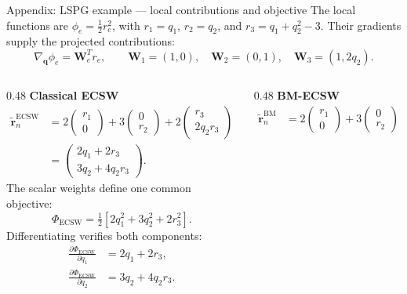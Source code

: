 \documentclass[aspectratio=169]{beamer}
\newcommand{\vect}[1]{\boldsymbol{#1}}
\newcommand{\matr}[1]{\boldsymbol{#1}}
\begin{document}
\begin{frame}{Appendix: LSPG example --- local contributions and objective}
\hypertarget{bmecsw-lspg-example-details}{}
\fontsize{9}{10.5}\selectfont
\setlength{\parskip}{0pt}
\setlength{\abovedisplayskip}{1pt}
\setlength{\belowdisplayskip}{1pt}
\setlength{\abovedisplayshortskip}{1pt}
\setlength{\belowdisplayshortskip}{1pt}
The local functions are $\phi_e=\tfrac12 r_e^2$, with
$r_1=q_1$, $r_2=q_2$, and $r_3=q_1+q_2^2-3$.
Their gradients supply the projected contributions:
\[
  \nabla_{\vect{q}}\phi_e=\matr{W}_e^T r_e,
  \qquad
  \matr{W}_1=(1,0),\quad \matr{W}_2=(0,1),\quad \matr{W}_3=(1,2q_2).
\]
\begin{columns}[T,onlytextwidth]
\begin{column}{0.48\textwidth}
\textbf{Classical ECSW}
\[
\begin{aligned}
 \widetilde{\vect{r}}_n^{\mathrm{ECSW}}
 &=2\begin{pmatrix}r_1\\0\end{pmatrix}
  +3\begin{pmatrix}0\\r_2\end{pmatrix}
  +2\begin{pmatrix}r_3\\2q_2r_3\end{pmatrix}\\[3pt]
 &=\begin{pmatrix}2q_1+2r_3\\3q_2+4q_2r_3\end{pmatrix}.
\end{aligned}
\]
The scalar weights define one common objective:
\[
  \Phi_{\mathrm{ECSW}}
  =\tfrac12\left[2q_1^2+3q_2^2+2r_3^2\right].
\]
Differentiating verifies both components:
\[
\begin{aligned}
  \frac{\partial\Phi_{\mathrm{ECSW}}}{\partial q_1}
  &=2q_1+2r_3,\\
  \frac{\partial\Phi_{\mathrm{ECSW}}}{\partial q_2}
  &=3q_2+4q_2r_3.
\end{aligned}
\]
\end{column}
\begin{column}{0.48\textwidth}
\textbf{BM-ECSW}
\[
\begin{aligned}
 \widetilde{\vect{r}}_n^{\mathrm{BM}}
 &=2\begin{pmatrix}r_1\\0\end{pmatrix}
  +3\begin{pmatrix}0\\r_2\end{pmatrix}

\end{aligned}\]
\end{column}
\end{columns}
\end{frame}
\end{document}
